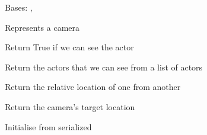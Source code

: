 \documentclass[letterpaper,10pt,english]{sphinxmanual}
\begin{document}
\begin{fulllineitems}
\label{renderering:serge.camera.Camera}
Bases: {\hyperref[common:serge.common.Loggable]{}}, {\hyperref[geometry:serge.geometry.Rectangle]{}}

Represents a camera

\begin{fulllineitems}
\label{renderering:serge.camera.Camera.canSee}
Return True if we can see the actor

\end{fulllineitems}


\begin{fulllineitems}
\label{renderering:serge.camera.Camera.canSeeActors}
Return the actors that we can see from a list of actors

\end{fulllineitems}


\begin{fulllineitems}
\label{renderering:serge.camera.Camera.getRelativeLocation}
Return the relative location of one from another

\end{fulllineitems}


\begin{fulllineitems}
\label{renderering:serge.camera.Camera.getTarget}
Return the camera's target location

\end{fulllineitems}


\begin{fulllineitems}
\label{renderering:serge.camera.Camera.init}
Initialise from serialized

\end{fulllineitems}


\end{fulllineitems}
\end{document}
